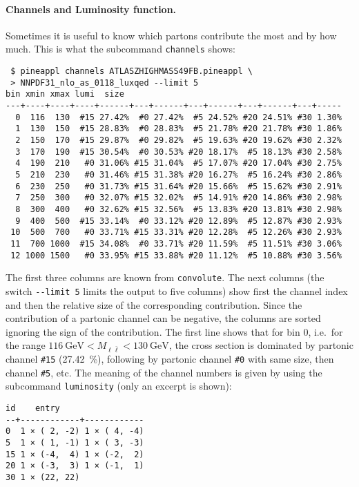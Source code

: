 \paragraph{Channels and Luminosity function.}
Sometimes it is useful to know which partons contribute the most and by how much.
This is what the subcommand \texttt{channels} shows:
\begin{verbatim}
 $ pineappl channels ATLASZHIGHMASS49FB.pineappl \
 > NNPDF31_nlo_as_0118_luxqed --limit 5
bin xmin xmax lumi  size
---+----+----+----+------+---+------+---+------+---+------+---+-----
  0  116  130  #15 27.42%  #0 27.42%  #5 24.52% #20 24.51% #30 1.30%
  1  130  150  #15 28.83%  #0 28.83%  #5 21.78% #20 21.78% #30 1.86%
  2  150  170  #15 29.87%  #0 29.82%  #5 19.63% #20 19.62% #30 2.32%
  3  170  190  #15 30.54%  #0 30.53% #20 18.17%  #5 18.13% #30 2.58%
  4  190  210   #0 31.06% #15 31.04%  #5 17.07% #20 17.04% #30 2.75%
  5  210  230   #0 31.46% #15 31.38% #20 16.27%  #5 16.24% #30 2.86%
  6  230  250   #0 31.73% #15 31.64% #20 15.66%  #5 15.62% #30 2.91%
  7  250  300   #0 32.07% #15 32.02%  #5 14.91% #20 14.86% #30 2.98%
  8  300  400   #0 32.62% #15 32.56%  #5 13.83% #20 13.81% #30 2.98%
  9  400  500  #15 33.14%  #0 33.12% #20 12.89%  #5 12.87% #30 2.93%
 10  500  700   #0 33.71% #15 33.31% #20 12.28%  #5 12.26% #30 2.93%
 11  700 1000  #15 34.08%  #0 33.71% #20 11.59%  #5 11.51% #30 3.06%
 12 1000 1500   #0 33.95% #15 33.88% #20 11.12%  #5 10.88% #30 3.56%
\end{verbatim}
The first three columns are known from \texttt{convolute}.
The next columns (the switch \texttt{-{}-limit 5} limits the output to five columns) show first the channel index and then the relative size of the corresponding contribution.
Since the contribution of a partonic channel can be negative, the columns are sorted ignoring the sign of the contribution.
The first line shows that for bin 0, i.e.\ for the range $\SI{116}{\giga\electronvolt} < M_{\ell \bar{\ell}} < \SI{130}{\giga\electronvolt}$, the cross section is dominated by partonic channel \texttt{\#15} (\SI{27.42}{\percent}), following by partonic channel \texttt{\#0} with same size, then channel \texttt{\#5}, etc.
The meaning of the channel numbers is given by using the subcommand \texttt{luminosity} (only an excerpt is shown):
\begin{verbatim}
id    entry
--+------------+------------
0  1 × ( 2, -2) 1 × ( 4, -4)
5  1 × ( 1, -1) 1 × ( 3, -3)
15 1 × (-4,  4) 1 × (-2,  2)
20 1 × (-3,  3) 1 × (-1,  1)
30 1 × (22, 22)
\end{verbatim}
